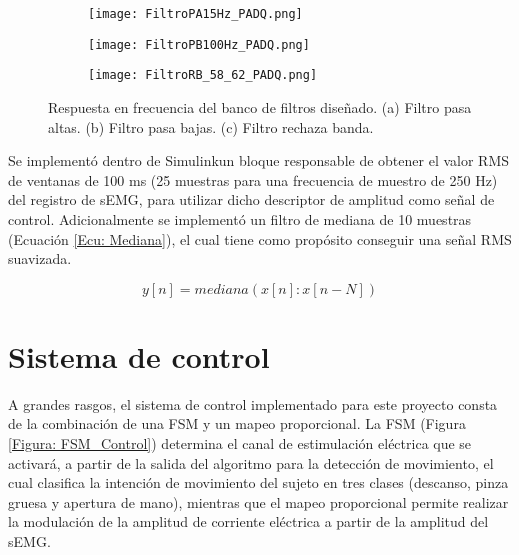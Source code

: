 \begin{figure}[htbp]
	\centering
	\begin{subfigure}[htbp]{0.7\textwidth}
		\texttt{[image: FiltroPA15Hz\_PADQ.png]}
		\caption{}
		\label{Figura: FiltroPA}
	\end{subfigure}
	
	\begin{subfigure}[htnp]{0.7\textwidth}
		\texttt{[image: FiltroPB100Hz\_PADQ.png]}
		\caption{}
		\label{Figura: FiltroPB}
	\end{subfigure}
	
	\begin{subfigure}[htbp]{0.7\textwidth}
		\texttt{[image: FiltroRB\_58\_62\_PADQ.png]}
		\caption{}
		\label{Figura: FiltroRB}
	\end{subfigure}
	\caption[Respuesta en frecuencia del banco de filtros diseñado]{Respuesta en frecuencia del banco de filtros diseñado. (a) Filtro pasa altas. (b) Filtro pasa bajas. (c) Filtro rechaza banda.}
	\label{Figura: Freqz_Filtros}
\end{figure}

Se implementó dentro de Simulink\textregistered \;un bloque responsable de obtener el valor RMS de ventanas de 100 ms (25 muestras para una frecuencia de muestro de 250 Hz) del registro de sEMG, para utilizar dicho descriptor de amplitud como señal de control. Adicionalmente se implementó un filtro de mediana de 10 muestras (Ecuación \ref{Ecu: Mediana}), el cual tiene como propósito conseguir una señal RMS suavizada.

\begin{equation}
	y[n] = mediana(x[n]:x[n-N])
	\label{Ecu: Mediana}
\end{equation}


\newpage
\section{Sistema de control}
A grandes rasgos, el sistema de control implementado para este proyecto consta de la combinación de una FSM y un mapeo proporcional. La FSM (Figura \ref{Figura: FSM_Control})  determina el canal de estimulación eléctrica que se activará, a partir de la salida del algoritmo para la detección de movimiento, el cual clasifica la intención de movimiento del sujeto en tres clases (descanso, pinza gruesa y apertura de mano), mientras que el mapeo proporcional permite realizar la modulación de la amplitud de corriente eléctrica a partir de la amplitud del sEMG.

